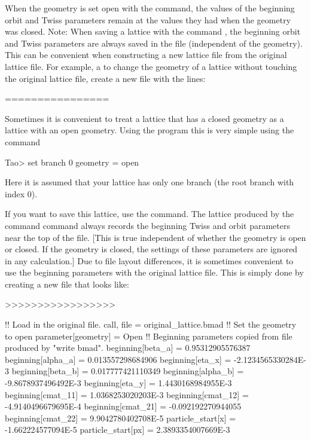 \documentclass{hitec}     %
\begin{document}
When the geometry is set open with the \tao {} command, the values of the beginning
orbit and Twiss parameters remain at the values they had when the geometry was closed. Note: When
saving a lattice with the \tao command , the beginning orbit and Twiss parameters are
always saved in the file (independent of the geometry). This can be convenient when constructing a
new lattice file from the original lattice file. For example, a to change the geometry of a lattice
without touching the original lattice file, create a new file with the lines:

================

Sometimes it is convenient to treat a lattice that has a closed geometry as a lattice with an open
geometry. Using the \tao program this is very simple using the  command
\begin{code}
Tao> set branch 0 geometry = open
\end{code}
Here it is assumed that your lattice has only one branch (the root branch with index 0). 

If you want to save this lattice, use the  command. The lattice produced by the
 command command always records the beginning Twiss and orbit parameters near the top
of the file. [This is true independent of whether the geometry is open or closed. If the geometry is
closed, the settings of these parameters are ignored in any calculation.] Due to file layout
differences, it is sometimes convenient to use the beginning parameters with the original
lattice file. This is simply done by creating a new file that looks like:

>>>>>>>>>>>>>>>>>

\begin{code}
!! Load in the original file.
call, file = original_lattice.bmad
!! Set the geometry to open
parameter[geometry] = Open
!! Beginning parameters copied from file produced by "write bmad".
beginning[beta_a]   = 0.95312905576387
beginning[alpha_a]  = 0.013557298684906
beginning[eta_x]    = -2.1234565330284E-3
beginning[beta_b]   = 0.017777421110349
beginning[alpha_b]  = -9.8678937496492E-3
beginning[eta_y]    = 1.4430168984955E-3
beginning[cmat_11]  = 1.0368253020203E-3
beginning[cmat_12]  = -4.9140496679695E-4
beginning[cmat_21]  = -0.092192270944055
beginning[cmat_22]  = 9.9042780402708E-5
particle_start[x]  = -1.662224577094E-5
particle_start[px] = 2.3893354007669E-3
\end{code}
\end{document}

